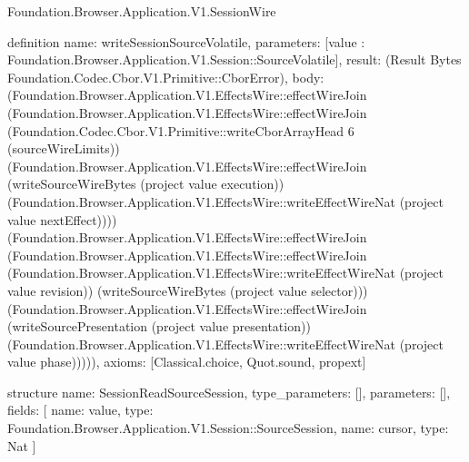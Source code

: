 \begin{lexlean}{Foundation.Browser.Application.V1.SessionWire}
\begin{semanticmodule}
definition{
  name: writeSessionSourceVolatile,
  parameters: [value : Foundation.Browser.Application.V1.Session::SourceVolatile],
  result: (Result Bytes Foundation.Codec.Cbor.V1.Primitive::CborError),
  body: (Foundation.Browser.Application.V1.EffectsWire::effectWireJoin (Foundation.Browser.Application.V1.EffectsWire::effectWireJoin (Foundation.Codec.Cbor.V1.Primitive::writeCborArrayHead 6 (sourceWireLimits)) (Foundation.Browser.Application.V1.EffectsWire::effectWireJoin (writeSourceWireBytes (project value execution)) (Foundation.Browser.Application.V1.EffectsWire::writeEffectWireNat (project value nextEffect)))) (Foundation.Browser.Application.V1.EffectsWire::effectWireJoin (Foundation.Browser.Application.V1.EffectsWire::effectWireJoin (Foundation.Browser.Application.V1.EffectsWire::writeEffectWireNat (project value revision)) (writeSourceWireBytes (project value selector))) (Foundation.Browser.Application.V1.EffectsWire::effectWireJoin (writeSourcePresentation (project value presentation)) (Foundation.Browser.Application.V1.EffectsWire::writeEffectWireNat (project value phase))))),
  axioms: [Classical.choice, Quot.sound, propext]
}

structure{
  name: SessionReadSourceSession,
  type_parameters: [],
  parameters: [],
  fields: [
    {name: value, type: Foundation.Browser.Application.V1.Session::SourceSession},
    {name: cursor, type: Nat}
  ]
}


\end{semanticmodule}
\end{lexlean}
